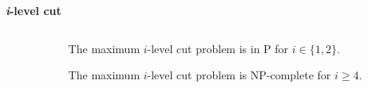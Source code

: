 \documentclass[english, aspectratio=169]{beamer}
\begin{document}
\begin{frame}
  \begin{center}
    \textbf{\LARGE \emph{i}-level cut}
  \end{center}
  \begin{columns}
    \begin{column}{0.55\textwidth}
      \begin{tikzpicture}[scale=0.9]
        
      \end{tikzpicture}
    \end{column}
    \begin{column}{0.44\textwidth}
       {
        \begin{lemma}
          The maximum $i$-level cut problem is in P for $i \in \{ 1,2 \}$.
        \end{lemma}

        \begin{theorem}
          The maximum $i$-level cut problem is NP-complete for $i \geq 4$.
        \end{theorem}
      }
    \end{column}
  \end{columns}
\end{frame}

\blankframe
\end{document}
